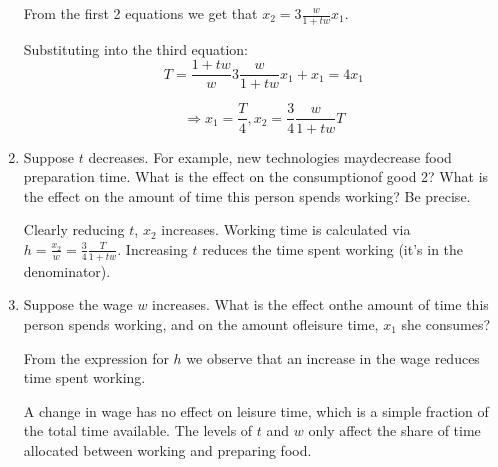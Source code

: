\documentclass{article}
\begin{document}
\begin{enumerate}
From the first 2 equations we get that $x_2 = 3 \frac{w}{1+t w} x_1$.

Substituting into the third equation:
\[ T = \frac{1+ t w}{w} 3 \frac{w}{1+t w} x_1 + x_1 = 4 x_1 \]

\[ \Rightarrow x_1 = \frac{T}{4}, x_2 =\frac{3}{4}  \frac{w}{1+t w} T \]

\color{black}

\item  Suppose $t$ decreases. For example, new technologies maydecrease food preparation time. What is the effect on the consumptionof good 2? What is the effect on the amount of time this person spends working? Be precise.

\color{red} 

Clearly reducing $t$, $x_2$ increases.
Working time is calculated via $h = \frac{x_2}w = \frac34 \frac{T}{1+t w}$.
Increasing $t$ reduces the time spent working (it's in the denominator).

\color{black} 

\item  Suppose the wage $w$ increases. What is the effect onthe amount of time this person spends working, and on the amount ofleisure time, $x_1$ she consumes?

\color{red} 

From the expression for $h$ we observe that an increase in the wage reduces time spent working.

A change in wage has no effect on leisure time, which is a simple fraction of the total time available.
The levels of $t$ and $w$  only affect the share of time allocated between working and preparing food.

\color{black} 
\end{enumerate}
\end{document}
